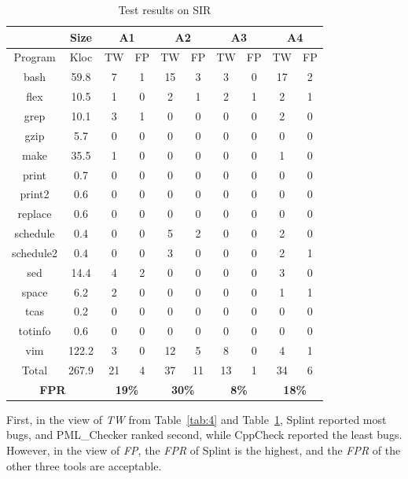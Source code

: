 \begin{table}[!t]
\caption{Test results on SIR}\label{tab:5}
\raggedleft
\hspace{-0.5cm}\begin{tabular}{|c|c|c|c|c|c|c|c|c|c|}
\hline
& \textbf{Size} & \multicolumn{2}{|c|}{\textbf{A1}} & \multicolumn{2}{|c|}{\textbf{A2}} & \multicolumn{2}{|c|}{\textbf{A3}} & \multicolumn{2}{|c|}{\textbf{A4}}\\
\hline
Program & Kloc & TW & FP & TW & FP & TW & FP & TW & FP\\
\hline
bash       & 59.8 &7	&1	  & 15  & 3  & 3	 & 0   & 17  & 2\\
\hline
flex	       & 10.5  & 1	& 0	  & 2    & 1  & 2	 & 1	   & 2   & 1\\
\hline
grep	 & 10.1 & 3	& 1	  & 0    & 0  & 0	 & 0	   & 2   & 0\\
\hline
gzip	       & 5.7   & 0	& 0	  & 0    & 0  & 0	 & 0	   & 0   & 0\\
\hline
make	 & 35.5 &1	& 0	  & 0    & 0  & 0	 & 0	   & 1   & 0\\
\hline
print	 & 0.7   &  0	& 0	  & 0    & 0  & 0	 & 0	   & 0   & 0\\
\hline
print2	 & 0.6   & 0	& 0	  & 0    & 0  & 0	 & 0   &	0   & 0\\
\hline
replace    & 0.6   & 0	& 0	  & 0    & 0  & 0	 & 0	   & 0   & 0\\
\hline
schedule  & 0.4	& 0	& 0	  & 5    & 2  & 0	 & 0	   & 2   & 0\\
\hline
schedule2 & 0.4	& 0	& 0    & 3    & 0  & 0	 & 0	   & 2   & 1\\
\hline
sed	        & 14.4	& 4	& 2    &	0   & 0  & 0	 & 0	   & 3   & 0\\
\hline
space	 & 6.2	& 2	& 0	   & 0   & 0  & 0	 & 0	   & 1   & 1\\
\hline
tcas	       & 0.2	& 0	& 0    &	0   & 0  & 0	 & 0    & 0   & 0\\
\hline
totinfo	 & 0.6	& 0  & 0	   & 0    & 0  & 0	 & 0	   & 0   & 0\\
\hline
vim        & 122.2	& 3	& 0	   & 12  & 5  & 8	 & 0	   & 4   & 1\\
\hline
Total	 & 267.9	 & 21&4	   & 37  & 11 & 13 & 1   & 34  & 6\\
\hline
\multicolumn{2}{|c|}{\textbf{FPR}} & \multicolumn{2}{|c|}{\textbf{19\%}} & \multicolumn{2}{|c|}{\textbf{30\%}} & \multicolumn{2}{|c|}{\textbf{8\%}} & \multicolumn{2}{|c|}{\textbf{18\%}}\\
\hline
\end{tabular}
\end{table}
First, in the view of \textit{TW} from Table~\ref{tab:4} and Table~\ref{tab:5}, Splint reported most bugs, and PML\_Checker ranked second, while CppCheck reported the least bugs. However, in the view of \textit{FP}, the \textit{FPR} of Splint is the highest, and the \textit{FPR} of the other three tools are acceptable.

